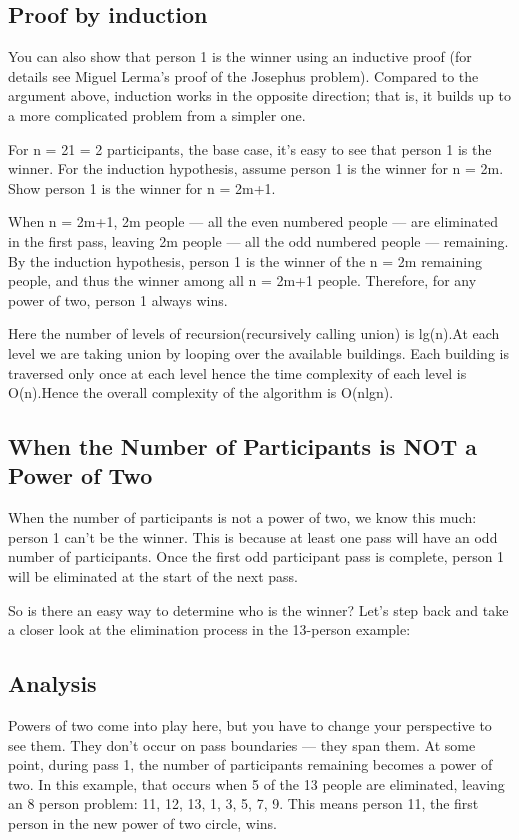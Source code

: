 \documentclass[12pt]{article}
\begin{document}
\subsection*{Proof by induction}
You can also show that person 1 is the winner using an inductive proof (for details see Miguel Lerma’s proof of the Josephus problem). Compared to the argument above, induction works in the opposite direction; that is, it builds up to a more complicated problem from a simpler one.

For n = 21 = 2 participants, the base case, it’s easy to see that person 1 is the winner. For the induction hypothesis, assume person 1 is the winner for n = 2m. Show person 1 is the winner for n = 2m+1.

When n = 2m+1, 2m people — all the even numbered people — are eliminated in the first pass, leaving 2m people — all the odd numbered people — remaining. By the induction hypothesis, person 1 is the winner of the n = 2m remaining people, and thus the winner among all n = 2m+1 people. Therefore, for any power of two, person 1 always wins.

Here the number of levels of recursion(recursively calling union) is lg(n).At each level we are taking union by looping over the available buildings. Each building is traversed only once at each level hence the time complexity of each level is O(n).Hence the overall complexity of the algorithm is O(nlgn).



\subsection*{When the Number of Participants is NOT a Power of Two}
When the number of participants is not a power of two, we know this much: person 1 can’t be the winner. This is because at least one pass will have an odd number of participants. Once the first odd participant pass is complete, person 1 will be eliminated at the start of the next pass.

So is there an easy way to determine who is the winner? Let’s step back and take a closer look at the elimination process in the 13-person example:

\subsection*{Analysis}
Powers of two come into play here, but you have to change your perspective to see them. They don’t occur on pass boundaries — they span them. At some point, during pass 1, the number of participants remaining becomes a power of two. In this example, that occurs when 5 of the 13 people are eliminated, leaving an 8 person problem: 11, 12, 13, 1, 3, 5, 7, 9. This means person 11, the first person in the new power of two circle, wins.
\end{document}
